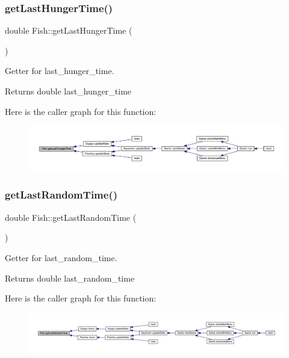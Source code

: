 \subsubsection{\texorpdfstring{get\+Last\+Hunger\+Time()}{getLastHungerTime()}}
{\footnotesize\ttfamily double Fish\+::get\+Last\+Hunger\+Time (\begin{DoxyParamCaption}{ }\end{DoxyParamCaption})}



Getter for last\+\_\+hunger\+\_\+time. 

\begin{DoxyReturn}{Returns}
double last\+\_\+hunger\+\_\+time 
\end{DoxyReturn}
Here is the caller graph for this function\+:
\nopagebreak
\begin{figure}[H]
\begin{center}
\leavevmode
\includegraphics[width=350pt]{class_fish_ab097bcfc0f0402bc1c9e048bf2351290_icgraph}
\end{center}
\end{figure}
\mbox{\label{class_fish_a4edfa0e606e5db4a648fdd5d016e1543}} 
\subsubsection{\texorpdfstring{get\+Last\+Random\+Time()}{getLastRandomTime()}}
{\footnotesize\ttfamily double Fish\+::get\+Last\+Random\+Time (\begin{DoxyParamCaption}{ }\end{DoxyParamCaption})}



Getter for last\+\_\+random\+\_\+time. 

\begin{DoxyReturn}{Returns}
double last\+\_\+random\+\_\+time 
\end{DoxyReturn}
Here is the caller graph for this function\+:
\nopagebreak
\begin{figure}[H]
\begin{center}
\leavevmode
\includegraphics[width=350pt]{class_fish_a4edfa0e606e5db4a648fdd5d016e1543_icgraph}
\end{center}
\end{figure}
\mbox{\label{class_fish_a3f9ad26c3d1dfbc3d1334065691d55da}} 
